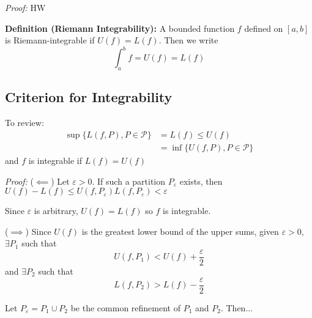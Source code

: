 \documentclass[12pt]{report}
\newcommand{\ep}{\varepsilon}
\newenvironment*{tbox}[2][gray]{
    \begin{tcolorbox}[
        parbox=false,
        colback=#1!5!white,
        colframe=#1!75!black,
        breakable,
        title={#2}
    ]}
    {\end{tcolorbox}}
\begin{document}
    \begin{tbox}{\textbf{Lemma:} For any bounded function $f$ on $[a, b]$ we always have $U(f) \geq L(f)$ }
        \emph{Proof:} HW
    \end{tbox}

    \textbf{Definition (Riemann Integrability):} A bounded function $f$ defined on $[a, b]$ is Riemann-integrable if $U(f) = L(f)$. Then we write 
    \[\int_a^b f = U(f) = L(f)\]

    \subsection*{Criterion for Integrability}
    To review:
    \begin{align*}
        \sup\{L(f, P), P \in \mathcal{P}\} &= L(f) \leq U(f)\\ 
            &= \inf\{U(f, P), P \in \mathcal{P}\}
    \end{align*}
    and $f$ is integrable if $L(f) = U(f)$

    \begin{tbox}{\textbf{Theorem (Integrability Criterion):} A bounded function $f$ is interable on $[a, b]$ iff $\forall \ep > 0$, $\exists P_{\ep}$, a partition of ${a, b}$ such that 
        \[U(f, P_{\ep}) - L(f, P_{\ep}) < \ep\] }
        \emph{Proof:} ($\impliedby$) Let $\ep > 0$. If such a partition $P_{\ep}$ exists, then $U(f) - L(f) \leq U(f, P_{\ep})  L(f, P_{\ep}) < \ep$

        Since $\ep$ is arbitrary, $U(f) = L(f)$ so $f$ is integrable. 

        ($\implies$) Since $U(f)$ is the greatest lower bound of the upper sums, given $\ep > 0$, $\exists P_1$ such that
        \[U(f, P_1) < U(f) + \frac{\ep}{2}\]
        and $\exists P_2$ such that 
        \[L(f, P_2) > L(f) - \frac{\ep}{2}\]

        Let $P_{\ep} = P_1 \cup P_2$ be the common refinement of $P_1$ and $P_2$. Then...
    \end{tbox}
\end{document}
